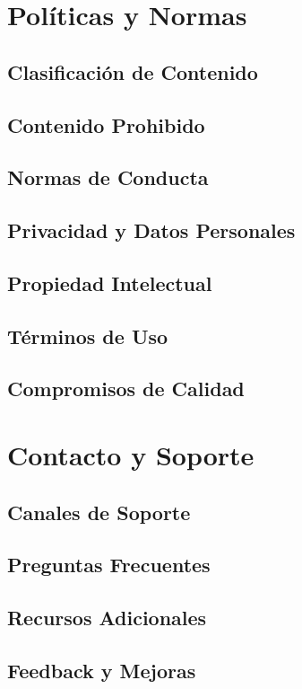 \documentclass[11pt,a4paper,twoside]{book}
\begin{document}
\chapter{Políticas y Normas}
\section{Clasificación de Contenido}
\section{Contenido Prohibido}
\section{Normas de Conducta}
\section{Privacidad y Datos Personales}
\section{Propiedad Intelectual}
\section{Términos de Uso}
\section{Compromisos de Calidad}

\chapter{Contacto y Soporte}
\section{Canales de Soporte}
\section{Preguntas Frecuentes}
\section{Recursos Adicionales}
\section{Feedback y Mejoras}

\appendix
\end{document}
